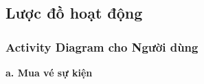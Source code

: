 

\subsection{Lược đồ hoạt động}

\subsubsection{Activity Diagram cho Người dùng}






\textbf{a. Mua vé sự kiện}

